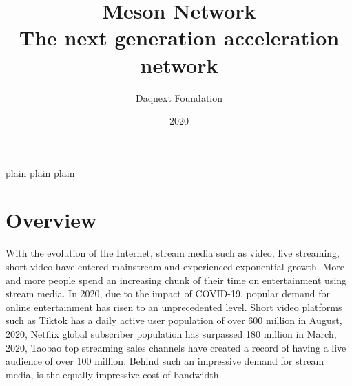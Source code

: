 \documentclass[12pt, a4paper, unicode]{report}
\author{Daqnext Foundation}
\title{\huge{Meson Network}\\
       \vspace{1pc}\large{The next generation acceleration network}}
\date{2020}
\begin{document}
\maketitle


% 



\startcontents[tocpart1] %
\startcontents[tocpart2] %
\stopcontents[tocpart2] %
\startcontents[tocappendix] %
\stopcontents[tocappendix] %

{plain}
{plain}
{plain}



\pagestyle{empty}

\section*{Overview}

    With the evolution of the Internet, stream media such as video, live streaming, short video have entered mainstream and experienced exponential growth. More and more people spend an increasing chunk of their time on entertainment using stream media. In 2020, due to the impact of COVID-19, popular demand for online entertainment has risen to an unprecedented level. Short video platforms such as Tiktok has a daily active user population of over 600 million in August, 2020, Netflix global subscriber population has surpassed 180 million in March, 2020, Taobao top streaming sales channels have created a record of having a live audience of over 100 million. Behind such an impressive demand for stream media, is the equally impressive cost of bandwidth.
\end{document}
